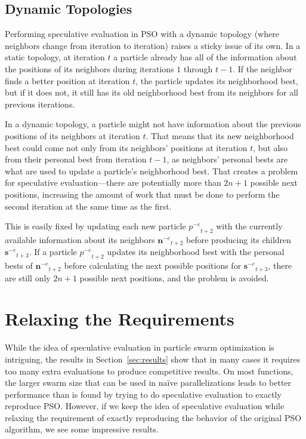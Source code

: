 \documentclass[smallcondensed]{svjour3}
\renewcommand{\sec}[1]{Section~\ref{sec:#1}}
\providecommand{\noeval}[1]{\ensuremath{#1^{-e}}}
\providecommand{\p}{\ensuremath{p}}
\providecommand{\sset}{\ensuremath{\mathbf{s}}}
\providecommand{\nset}{\ensuremath{\mathbf{n}}}
\begin{document}
\subsection{Dynamic Topologies}

Performing speculative evaluation in PSO with a dynamic topology (where
neighbors change from iteration to iteration) raises a sticky issue of its own.
In a static topology, at iteration $t$ a particle already has all of the
information about the positions of its neighbors during iterations $1$ through
$t-1$.  If the neighbor finds a better position at iteration $t$, the particle
updates its neighborhood best, but if it does not, it still has its old
neighborhood best from its neighbors for all previous iterations.

In a dynamic topology, a particle might not have information about the previous
positions of its neighbors at iteration $t$.  That means that its new
neighborhood best could come not only from its neighbors' positions at
iteration $t$, but also from their personal best from iteration $t-1$, as
neighbors' personal bests are what are used to update a particle's neighborhood
best.  That creates a problem for speculative evaluation---there are
potentially more than $2n+1$ possible next positions, increasing the amount of
work that must be done to perform the second iteration at the same time as the
first.

This is easily fixed by updating each new particle $\noeval{\p}_{t+2}$ with the
currently available information about its neighbors $\noeval{\nset}_{t+2}$
before producing its children $\noeval{\sset}_{t+3}$.  If a particle
$\noeval{\p}_{t+2}$ updates its neighborhood best with the personal bests of
$\noeval{\nset}_{t+2}$ before calculating the next possible positions for
$\noeval{\sset}_{t+3}$, there are still only $2n+1$ possible next positions,
and the problem is avoided.

\section{Relaxing the Requirements}
\label{sec:relax}

While the idea of speculative evaluation in particle swarm optimization is
intriguing, the results in \sec{results} show that in many cases it requires
too many extra evaluations to produce competitive results.  On most functions,
the larger swarm size that can be used in na\"ive parallelizations leads to
better performance than is found by trying to do speculative evaluation to
exactly reproduce PSO.  However, if we keep the idea of speculative evaluation
while relaxing the requirement of exactly reproducing the behavior of the
original PSO algorithm, we see some impressive results.
\end{document}
